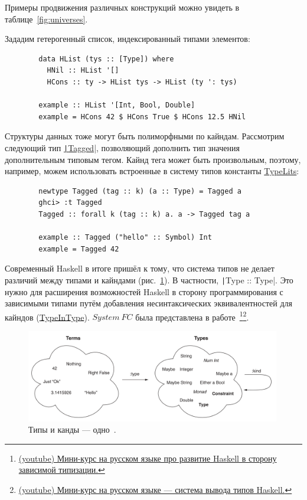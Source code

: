 \documentclass[12pt]{article}
\begin{document}
    Примеры продвижения различных конструкций можно увидеть в таблице~\ref{fig:universes}.

    Зададим гетерогенный список, индексированный типами элементов:
    \begin{verbatim}
        data HList (tys :: [Type]) where
          HNil :: HList '[]
          HCons :: ty -> HList tys -> HList (ty ': tys)

        example :: HList '[Int, Bool, Double]
        example = HCons 42 $ HCons True $ HCons 12.5 HNil
    \end{verbatim}

    Структуры данных тоже могут быть полиморфными по кайндам.
    Рассмотрим следующий тип \href{https://hackage.haskell.org/package/tagged-0.8.8/docs/Data-Tagged.html#t:Tagged}{\texttt|Tagged|}, позволяющий дополнить тип значения дополнительным типовым тегом.
    Кайнд тега может быть произвольным, поэтому, например, можем использовать встроенные в систему типов константы \href{https://ghc.gitlab.haskell.org/ghc/doc/users_guide/exts/type_literals.html}{TypeLits}:
    \begin{verbatim}
        newtype Tagged (tag :: k) (a :: Type) = Tagged a
        ghci> :t Tagged
        Tagged :: forall k (tag :: k) a. a -> Tagged tag a

        example :: Tagged ("hello" :: Symbol) Int
        example = Tagged 42
    \end{verbatim}

    Современный Haskell в итоге пришёл к тому, что система типов не делает различий между типами и кайндами (рис.~\ref{fig:types-eq-kinds}).
    В частности, \texttt|Type :: Type|.
    Это нужно для расширения возможностей Haskell в сторону программирования с зависимыми типами путём добавления несинтаксических эквивалентностей для кайндов (\href{https://ghc.gitlab.haskell.org/ghc/doc/users_guide/exts/poly_kinds.html#extension-TypeInType}{TypeInType}).
    $System~FC$ была представлена в работе~\cite{weirich2013system}\footnote{\href{https://www.youtube.com/watch?v=ISGENChlA4M&list=PLvPsfYrGz3wufQguebnCduYgQQ9UMeJRt}{(youtube) Мини-курс на русском языке про развитие Haskell в сторону зависимой типизации.}}\footnote{\href{https://www.youtube.com/watch?v=_HYI7zjkrEs&list=PLvPsfYrGz3wuVAGhNf6-i7uafXg56oqM5&index=1}{(youtube) Мини-курс на русском языке --- система вывода типов Haskell.}}.

    \begin{figure}
        \centering
        \includegraphics[width=0.99\textwidth]{figs/types-eq-kinds}
        \caption{Типы и канды --- одно~\cite{bragilevsky-haskell}.}
        \label{fig:types-eq-kinds}
    \end{figure}
\end{document}
